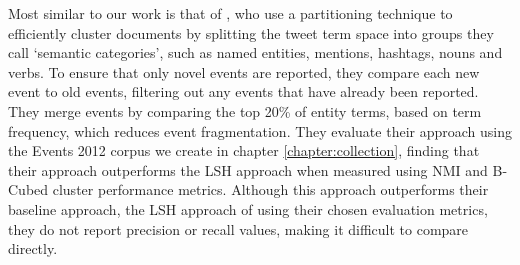 Most similar to our work is that of \cite{Reuters2017}, who use a partitioning technique to efficiently cluster documents by splitting the tweet term space into groups they call `semantic categories', such as named entities, mentions, hashtags, nouns and verbs.
To ensure that only novel events are reported, they compare each new event to old events, filtering out any events that have already been reported.
They merge events by comparing the top 20\% of entity terms, based on term frequency, which reduces event fragmentation.
They evaluate their approach using the Events 2012 corpus we create in chapter \ref{chapter:collection}, finding that their approach outperforms the LSH approach when measured using NMI and B-Cubed cluster performance metrics.
Although this approach outperforms their baseline approach, the LSH approach of \cite{Petrovic:2010:SFS:1857999.1858020} using their chosen evaluation metrics, they do not report precision or recall values, making it difficult to compare directly.